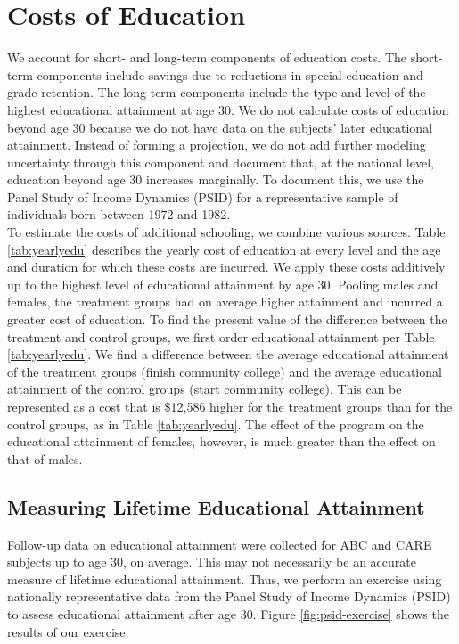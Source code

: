 \section{Costs of Education} \label{appendix:education}

\noindent We account for short- and long-term components of education costs. The short-term components include savings due to reductions in special education and grade retention. The long-term components include the type and level of the highest educational attainment at age 30. We do not calculate costs of education beyond age 30 because we do not have data on the subjects' later educational attainment. Instead of forming a projection, we do not add further modeling uncertainty through this component and document that, at the national level, education beyond age 30 increases marginally. To document this, we use the  Panel Study of Income Dynamics (PSID) for a representative sample of individuals born between 1972 and 1982. \\

\noindent To estimate the costs of additional schooling, we combine various sources. Table \ref{tab:yearlyedu}  describes the yearly cost of education at every level and the age and duration for which these costs are incurred. We apply these costs additively up to the highest level of educational attainment by age 30. Pooling males and females, the treatment groups had on average higher attainment and incurred a greater cost of education. To find the present value of the difference between the treatment and control groups, we first order educational attainment per Table \ref{tab:yearlyedu}. We find a difference between the average educational attainment of the treatment groups (finish community college) and the average educational attainment of the control groups (start community college). This can be represented as a cost that is \$12,586 higher for the treatment groups than for the control groups, as in Table \ref{tab:yearlyedu}. The effect of the program on the educational attainment of females, however, is much greater than the effect on that of males.

\subsection{Measuring Lifetime Educational Attainment}

\noindent Follow-up data on educational attainment were collected for ABC and CARE subjects up to age 30, on average. This may not necessarily be an accurate measure of lifetime educational attainment. Thus, we perform an exercise using nationally representative data from the Panel Study of Income Dynamics (PSID) to assess educational attainment after age 30. Figure \ref{fig:psid-exercise} shows the results of our exercise. \\

